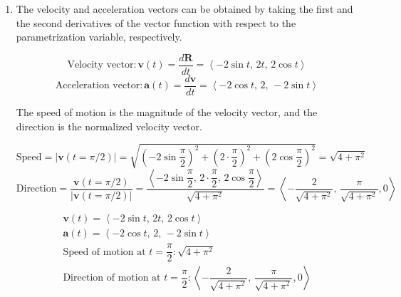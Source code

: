 \documentclass[a4paper, 12pt]{article}
\begin{document}
\begin{enumerate}[leftmargin=*,label=\textbf{\arabic*.}]
\begin{enumerate}[leftmargin=*,label=\textbf{\alph*.}]
\newpage
\item Hyperbolic paraboloid
\begin{center}
\end{center}

\end{enumerate}

\item The velocity and acceleration vectors can be obtained by taking the first and the second derivatives of the vector function with respect to the parametrization variable, respectively.

\[\text{Velocity vector}:\mathbf v(t)=\frac{d\mathbf R}{dt}=\left\langle-2\sin t,\,2t,\,2\cos t\right\rangle\]
\[\text{Acceleration vector}:\mathbf a(t)=\frac{d\mathbf v}{dt}=\left\langle-2\cos t,\,2,\,-2\sin t\right\rangle\]

The speed of motion is the magnitude of the velocity vector, and the direction is the normalized velocity vector.

\[\text{Speed}=\left|\mathbf v(t=\pi/2)\right|=\sqrt{\left(-2\sin\frac\pi2\right)^2+\left(2\cdot\frac\pi2\right)^2+\left(2\cos\frac\pi2\right)^2}=\sqrt{4+\pi^2}\]
\[\text{Direction}=\frac{\mathbf v(t=\pi/2)}{\left|\mathbf v(t=\pi/2)\right|}=\frac{\left\langle-2\sin\dfrac\pi2,\,2\cdot\dfrac\pi2,\,2\cos\dfrac\pi2\right\rangle}{\sqrt{4+\pi^2}}=\left\langle-\frac2{\sqrt{4+\pi^2}},\,\frac\pi{\sqrt{4+\pi^2}},0\right\rangle\]

\[\boxed{\begin{array}{c}
\mathbf v(t)=\left\langle-2\sin t,\,2t,\,2\cos t\right\rangle\\
\mathbf a(t)=\left\langle-2\cos t,\,2,\,-2\sin t\right\rangle\\[1em]
\text{Speed of motion at }t=\dfrac\pi2:\sqrt{4+\pi^2}\\
\text{Direction of motion at }t=\dfrac\pi2:\left\langle-\dfrac2{\sqrt{4+\pi^2}},\,\dfrac\pi{\sqrt{4+\pi^2}},0\right\rangle\\
\end{array}}\]


\end{enumerate}
\end{document}
